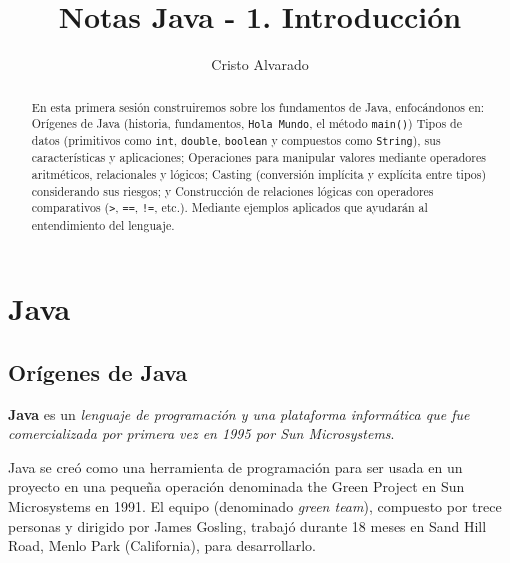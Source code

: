\documentclass[12pt]{article}
\theoremstyle{largebreak}
\begin{document}
    \setlength{\parskip}{5pt} %
    \setlength{\parindent}{12pt} %
    \title{Notas Java - 1. Introducción}
    \author{Cristo Alvarado}
    \maketitle

    \begin{abstract}
        En esta primera sesión construiremos sobre los fundamentos de Java, enfocándonos en: Orígenes de Java (historia, fundamentos, \lstinline|Hola Mundo|, el método \lstinline|main()|) Tipos de datos (primitivos como \lstinline|int|, \lstinline|double|, \lstinline|boolean| y compuestos como \lstinline|String|), sus características y aplicaciones; Operaciones para manipular valores mediante operadores aritméticos, relacionales y lógicos; Casting (conversión implícita y explícita entre tipos) considerando sus riesgos; y Construcción de relaciones lógicas con operadores comparativos (\lstinline|>|, \lstinline|==|, \lstinline|!=|, etc.). Mediante ejemplos aplicados que ayudarán al entendimiento del lenguaje.
    \end{abstract}
    
    \tableofcontents

    \lstlistoflistings

    \section{Java}

    \subsection{Orígenes de Java}

    \begin{mydef}
        \textbf{Java} es un \textit{lenguaje de programación y una plataforma informática que fue comercializada por primera vez en 1995 por Sun Microsystems}.
    \end{mydef}

    Java se creó como una herramienta de programación para ser usada en un proyecto en una pequeña operación denominada the Green Project en Sun Microsystems en 1991. El equipo (denominado \textit{green team}), compuesto por trece personas y dirigido por James Gosling, trabajó durante 18 meses en Sand Hill Road, Menlo Park (California), para desarrollarlo.
\end{document}
